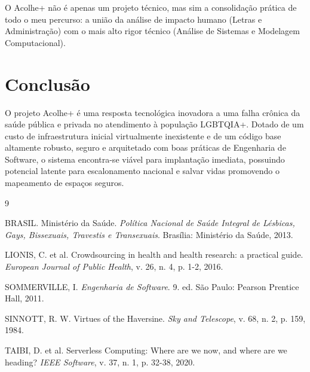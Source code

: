 \documentclass[12pt, a4paper]{article}
\begin{document}
O Acolhe+ não é apenas um projeto técnico, mas sim a consolidação prática de todo o meu percurso: a união da análise de impacto humano (Letras e Administração) com o mais alto rigor técnico (Análise de Sistemas e Modelagem Computacional).

\section{Conclusão}

O projeto Acolhe+ é uma resposta tecnológica inovadora a uma falha crônica da saúde pública e privada no atendimento à população LGBTQIA+. Dotado de um custo de infraestrutura inicial virtualmente inexistente e de um código base altamente robusto, seguro e arquitetado com boas práticas de Engenharia de Software, o sistema encontra-se viável para implantação imediata, possuindo potencial latente para escalonamento nacional e salvar vidas promovendo o mapeamento de espaços seguros.
\begin{thebibliography}{9}

BRASIL. Ministério da Saúde. \textit{Política Nacional de Saúde Integral de Lésbicas, Gays, Bissexuais, Travestis e Transexuais}. Brasília: Ministério da Saúde, 2013.

LIONIS, C. et al. Crowdsourcing in health and health research: a practical guide. \textit{European Journal of Public Health}, v. 26, n. 4, p. 1-2, 2016.

SOMMERVILLE, I. \textit{Engenharia de Software}. 9. ed. São Paulo: Pearson Prentice Hall, 2011.

SINNOTT, R. W. Virtues of the Haversine. \textit{Sky and Telescope}, v. 68, n. 2, p. 159, 1984.

TAIBI, D. et al. Serverless Computing: Where are we now, and where are we heading? \textit{IEEE Software}, v. 37, n. 1, p. 32-38, 2020.

\end{thebibliography}
\end{document}
